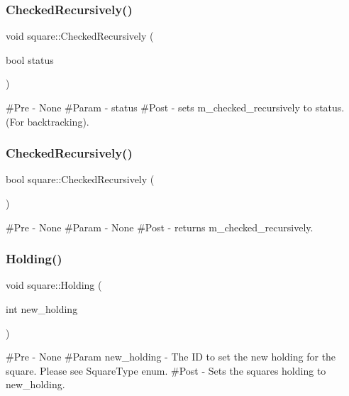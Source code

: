 \subsubsection{\texorpdfstring{CheckedRecursively()}{CheckedRecursively()}\hspace{0.1cm}{\footnotesize\ttfamily [1/2]}}
{\footnotesize\ttfamily void square\+::\+Checked\+Recursively (\begin{DoxyParamCaption}\item[{bool}]{status }\end{DoxyParamCaption})}

\#\+Pre -\/ None \#\+Param -\/ status \#\+Post -\/ sets m\+\_\+checked\+\_\+recursively to status. (For backtracking). \mbox{\label{classsquare_acb16014b1e47b12b5f8e982d2c5a33f9}} 
\subsubsection{\texorpdfstring{CheckedRecursively()}{CheckedRecursively()}\hspace{0.1cm}{\footnotesize\ttfamily [2/2]}}
{\footnotesize\ttfamily bool square\+::\+Checked\+Recursively (\begin{DoxyParamCaption}{ }\end{DoxyParamCaption})}

\#\+Pre -\/ None \#\+Param -\/ None \#\+Post -\/ returns m\+\_\+checked\+\_\+recursively. \mbox{\label{classsquare_a1f8541dab03c453d7cfc0e95687b4056}} 
\subsubsection{\texorpdfstring{Holding()}{Holding()}\hspace{0.1cm}{\footnotesize\ttfamily [1/2]}}
{\footnotesize\ttfamily void square\+::\+Holding (\begin{DoxyParamCaption}\item[{int}]{new\+\_\+holding }\end{DoxyParamCaption})}

\#\+Pre -\/ None \#\+Param new\+\_\+holding -\/ The ID to set the new holding for the square. Please see Square\+Type enum. \#\+Post -\/ Sets the square\textquotesingle{}s holding to new\+\_\+holding. \mbox{\label{classsquare_a891498f84fd9d6f4c412369fe51e7347}} 
